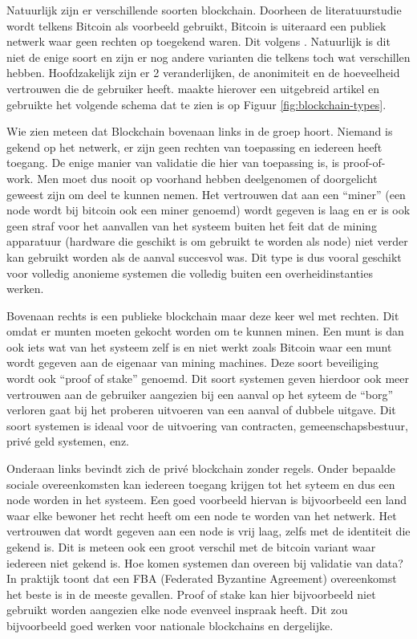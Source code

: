 Natuurlijk zijn er verschillende soorten blockchain. Doorheen de literatuurstudie wordt telkens Bitcoin als voorbeeld gebruikt, Bitcoin is uiteraard een publiek netwerk waar geen rechten op toegekend waren. Dit volgens \textcite{Nakamoto2008}. Natuurlijk is dit niet de enige soort en zijn er nog andere varianten die telkens toch wat verschillen hebben. Hoofdzakelijk zijn er 2 veranderlijken, de anonimiteit en de hoeveelheid vertrouwen die de gebruiker heeft. \textcite{Kravchenko2016} maakte hierover een uitgebreid artikel en gebruikte het volgende schema dat te zien is op Figuur \ref{fig:blockchain-types}.

Wie zien meteen dat Blockchain bovenaan links in de groep hoort. Niemand is gekend op het netwerk, er zijn geen rechten van toepassing en iedereen heeft toegang. De enige manier van validatie die hier van toepassing is, is proof-of-work. Men moet dus nooit op voorhand hebben deelgenomen of doorgelicht geweest zijn om deel te kunnen nemen. Het vertrouwen dat aan een ``miner'' (een node wordt bij bitcoin ook een miner genoemd) wordt gegeven is laag en er is ook geen straf voor het aanvallen van het systeem buiten het feit dat de mining apparatuur (hardware die geschikt is om gebruikt te worden als node) niet verder kan gebruikt worden als de aanval succesvol was. Dit type is dus vooral geschikt voor volledig anonieme systemen die volledig buiten een overheidinstanties werken. 

Bovenaan rechts is een publieke blockchain maar deze keer wel met rechten. Dit omdat er munten moeten gekocht worden om te kunnen minen. Een munt is dan ook iets wat van het systeem zelf is en niet werkt zoals Bitcoin waar een munt wordt gegeven aan de eigenaar van mining machines. Deze soort beveiliging wordt ook ``proof of stake'' genoemd. Dit soort systemen geven hierdoor ook meer vertrouwen aan de gebruiker aangezien bij een aanval op het syteem de ``borg'' verloren gaat bij het proberen uitvoeren van een aanval of dubbele uitgave. Dit soort systemen is ideaal voor de uitvoering van contracten, gemeenschapsbestuur, privé geld systemen, enz. 

Onderaan links bevindt zich de privé blockchain zonder regels. Onder bepaalde sociale overeenkomsten kan iedereen toegang krijgen tot het syteem en dus een node worden in het systeem. Een goed voorbeeld hiervan is bijvoorbeeld een land waar elke bewoner het recht heeft om een node te worden van het netwerk. Het vertrouwen dat wordt gegeven aan een node is vrij laag, zelfs met de identiteit die gekend is. Dit is meteen ook een groot verschil met de bitcoin variant waar iedereen niet gekend is. Hoe komen systemen dan overeen bij validatie van data? In praktijk toont dat een FBA (Federated Byzantine Agreement) overeenkomst het beste is in de meeste gevallen. Proof of stake kan hier bijvoorbeeld niet gebruikt worden aangezien elke node evenveel inspraak heeft. Dit zou bijvoorbeeld goed werken voor nationale blockchains en dergelijke. 

